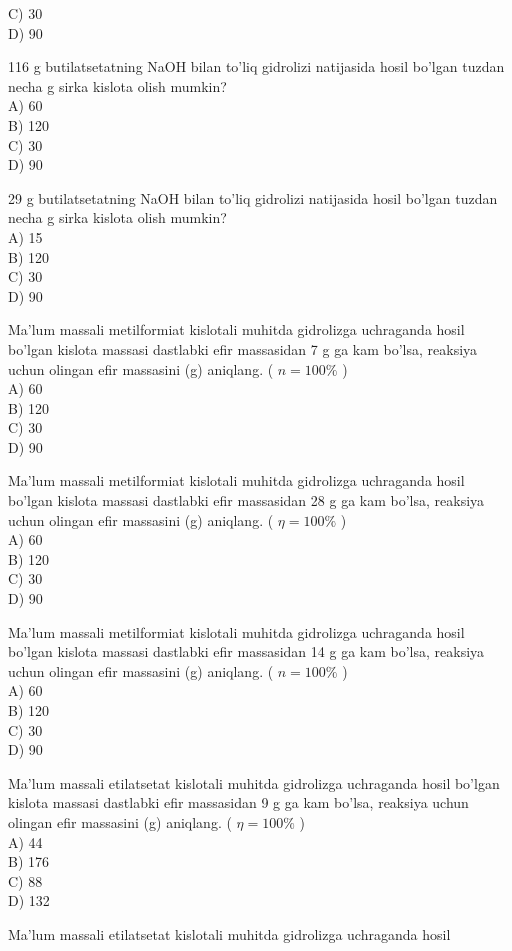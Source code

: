 C) 30\\
D) 90
  \item 116 g butilatsetatning NaOH bilan to'liq gidrolizi natijasida hosil bo'lgan tuzdan necha g sirka kislota olish mumkin?\\
A) 60\\
B) 120\\
C) 30\\
D) 90
  \item 29 g butilatsetatning NaOH bilan to'liq gidrolizi natijasida hosil bo'lgan tuzdan necha g sirka kislota olish mumkin?\\
A) 15\\
B) 120\\
C) 30\\
D) 90
  \item Ma'lum massali metilformiat kislotali muhitda gidrolizga uchraganda hosil bo'lgan kislota massasi dastlabki efir massasidan 7 g ga kam bo'lsa, reaksiya uchun olingan efir massasini (g) aniqlang. ( $n=100 \%$ )\\
A) 60\\
B) 120\\
C) 30\\
D) 90
  \item Ma'lum massali metilformiat kislotali muhitda gidrolizga uchraganda hosil bo'lgan kislota massasi dastlabki efir massasidan 28 g ga kam bo'lsa, reaksiya uchun olingan efir massasini (g) aniqlang. ( $\eta=100 \%$ )\\
A) 60\\
B) 120\\
C) 30\\
D) 90
  \item Ma'lum massali metilformiat kislotali muhitda gidrolizga uchraganda hosil bo'lgan kislota massasi dastlabki efir massasidan 14 g ga kam bo'lsa, reaksiya uchun olingan efir massasini (g) aniqlang. ( $n=100 \%$ )\\
A) 60\\
B) 120\\
C) 30\\
D) 90
  \item Ma'lum massali etilatsetat kislotali muhitda gidrolizga uchraganda hosil bo'lgan kislota massasi dastlabki efir massasidan 9 g ga kam bo'lsa, reaksiya uchun olingan efir massasini (g) aniqlang. ( $\eta=100 \%$ )\\
A) 44\\
B) 176\\
C) 88\\
D) 132
  \item Ma'lum massali etilatsetat kislotali muhitda gidrolizga uchraganda hosil\\
